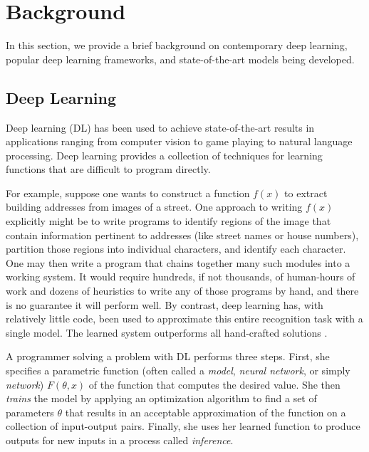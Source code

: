 \vspace{-1.5em}

\section{Background}
\label{sec:background}


In this section, we provide a brief background on contemporary deep learning,
  popular deep learning frameworks, and state-of-the-art
  models being developed.

\subsection{Deep Learning}

Deep learning (DL) has been used to achieve state-of-the-art results in applications ranging from
computer vision to game playing to natural language processing. Deep learning provides a collection of
techniques for learning functions that are difficult to program directly.

For example, suppose one wants to construct a function $f(x)$ to extract building addresses from
images of a street. One approach to writing $f(x)$ explicitly might be to write programs to identify
regions of the image that contain information pertinent to addresses (like street names or house
numbers), partition those regions into individual characters, and identify each character.
One may then write a program that chains together many such modules into a working system.
It would require hundreds, if not thousands, of human-hours of work and dozens of heuristics to
write any of those programs by hand, and there is no guarantee it will perform well.
By contrast, deep learning has, with relatively little code, been
used to approximate this entire recognition task with a single model. The learned system
outperforms all hand-crafted solutions \citep{streetview}.

A programmer solving a problem with DL performs three steps. First, she specifies a parametric
function (often called a \textit{model}, \textit{neural network}, or simply \textit{network})
$F(\theta, x)$ of the function that computes the desired value. She then \textit{trains} the model
by applying an optimization algorithm to find a set of parameters $\theta$ that results in an
acceptable approximation of the function on a collection of input-output pairs. Finally, she uses
her learned function to produce outputs for new inputs in a process called \textit{inference}.

